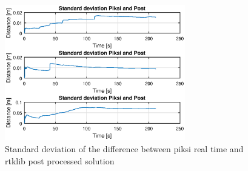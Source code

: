 \begin{figure}[H]
	\centering
		\includegraphics[width=0.7\textwidth]{figs/plots/stdpiksipost.eps}
		\caption{Standard deviation of the difference between piksi real time and rtklib post processed solution}
		\label{figure:RTKLIB_STRUCTURE}
\end{figure}

